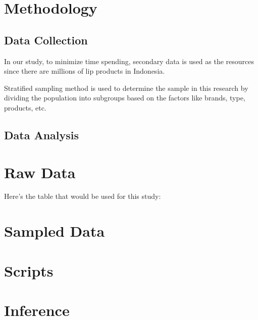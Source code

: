 \documentclass{article}
\begin{document}
          \section{Methodology}
        \subsection{Data Collection}
            In our study, to minimize time spending, secondary data is used as the resources since there are millions of lip products in Indonesia.

            Stratified sampling method is used to determine the sample in this research by dividing the population into subgroups based on the factors like brands, type, products, etc. 

        \subsection{Data Analysis}

    \section{Raw Data}
    Here's the table that would be used for this study:
    
    
    \section{Sampled Data}    
    \section{Scripts}
    \section{Inference}

	\newpage
	
	
	
\end{document}
